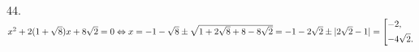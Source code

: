 44. $x^2+2(1+\sqrt{8})x+8\sqrt{2}=0\Leftrightarrow x=-1-\sqrt{8}\pm\sqrt{1+2\sqrt{8}+8-8\sqrt{2}}=-1-2\sqrt{2}\pm|2\sqrt{2}-1|=\left[\begin{gathered}
     -2,\hfill\\
     -4\sqrt{2}.\hfill \end{gathered}\right.$\\
